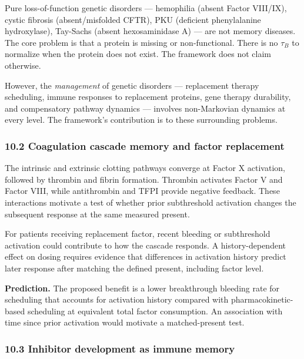 \documentclass[
]{article}
\begin{document}
Pure loss-of-function genetic disorders --- hemophilia (absent Factor
VIII/IX), cystic fibrosis (absent/misfolded CFTR), PKU (deficient
phenylalanine hydroxylase), Tay-Sachs (absent hexosaminidase A) --- are
not memory diseases. The core problem is that a protein is missing or
non-functional. There is no \(\tau_B\) to normalize when the protein
does not exist. The framework does not claim otherwise.

However, the \emph{management} of genetic disorders --- replacement
therapy scheduling, immune responses to replacement proteins, gene
therapy durability, and compensatory pathway dynamics --- involves
non-Markovian dynamics at every level. The framework's contribution is
to these surrounding problems.

\hypertarget{coagulation-cascade-memory-and-factor-replacement}{%
\subsubsection{10.2 Coagulation cascade memory and factor
replacement}\label{coagulation-cascade-memory-and-factor-replacement}}

The intrinsic and extrinsic clotting pathways converge at Factor X
activation, followed by thrombin and fibrin formation. Thrombin
activates Factor V and Factor VIII, while antithrombin and TFPI provide
negative feedback. These interactions motivate a test of whether prior
subthreshold activation changes the subsequent response at the same
measured present.

For patients receiving replacement factor, recent bleeding or
subthreshold activation could contribute to how the cascade responds. A
history-dependent effect on dosing requires evidence that differences in
activation history predict later response after matching the defined
present, including factor level.

\textbf{Prediction.} The proposed benefit is a lower breakthrough
bleeding rate for scheduling that accounts for activation history
compared with pharmacokinetic-based scheduling at equivalent total
factor consumption. An association with time since prior activation
would motivate a matched-present test.

\hypertarget{inhibitor-development-as-immune-memory}{%
\subsubsection{10.3 Inhibitor development as immune
memory}\label{inhibitor-development-as-immune-memory}}
\end{document}
